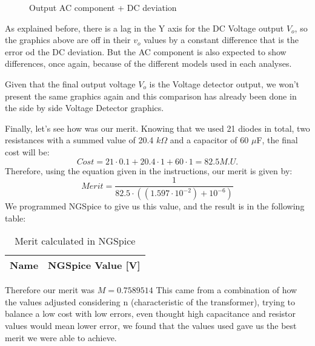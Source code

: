 \FloatBarrier
\begin{figure}
	\centering
	\qquad
	\caption{Output AC component + DC deviation}
	\label{fig:conc4}
\end{figure}
\FloatBarrier

As explained before, there is a lag in the Y axis for the DC Voltage output $V_o$, so the graphics above are off in their $v_o$ values by a constant difference that is the error od the DC deviation. But the AC component is also expected to show differences, once again, because of the different models used in each analyses.

Given that the final output voltage $V_o$ is the Voltage detector output, we won't present the same graphics again and this comparison has already been done in the side by side Voltage Detector graphics.

Finally, let's see how was our merit.
Knowing that we used 21 diodes in total, two resistances with a summed value of 20.4 $k\Omega$ and a capacitor of 60 $\mu$F, the final cost will be:
\begin{equation}
	Cost=21\cdot0.1+20.4\cdot1+60\cdot1=82.5 M.U.
\end{equation}
Therefore, using the equation given in the instructions, our merit is given by: 
\begin{equation}
	Merit=\frac{1}{82.5\cdot((1.597\cdot10^{-2})+10^{-6})}
\end{equation}
We programmed NGSpice to give us this value, and the result is in the following table:

\FloatBarrier
\begin{table}[h]
	\centering
	\begin{tabular}{|l|r|}
		\hline    
		{\bf Name} & {\bf NGSpice Value [V]} \\ \hline
				
	\end{tabular}
	\caption{Merit calculated in NGSpice}
	\label{tab:ngspice3}
\end{table}
\FloatBarrier

Therefore our merit was $M=0.7589514$
This came from a combination of how the values adjusted considering n (characteristic of the transformer), trying to balance a low cost with low errors, even thought high capacitance and resistor values would mean lower error, we found that the values used gave us the best merit we were able to achieve.


